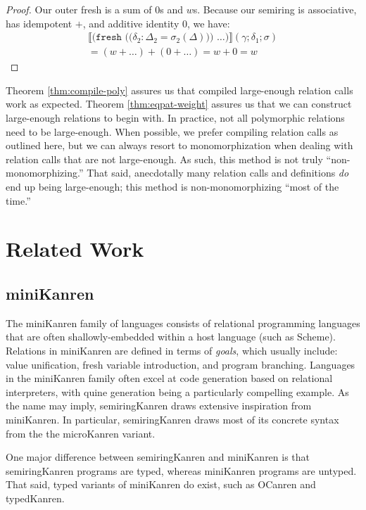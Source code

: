 \documentclass{report}
\theoremstyle{definition}
\newcommand{\den}[1]{\llbracket #1 \rrbracket}
\begin{document}
\begin{proof}
	Our outer fresh is a sum of \(0\)s and \(w\)s. Because our semiring is associative, has idempotent \(+\), and additive identity \(0\), we have:
	\begin{multline}
		\den{\texttt{(fresh ((\(\delta_2 : \Delta_2 = \sigma_2(\Delta)\))) \(\dots\))}}(\gamma;\delta_1;\sigma) \\
		= (w + \dots) + (0 + \dots) = w + 0 = w
	\end{multline}
\end{proof}

Theorem \ref{thm:compile-poly} assures us that compiled large-enough relation calls work as expected.
Theorem \ref{thm:eqpat-weight} assures us that we can construct large-enough relations to begin with.
In practice, not all polymorphic relations need to be large-enough.
When possible, we prefer compiling relation calls as outlined here, but we can always resort to monomorphization when dealing with relation calls that are not large-enough.
As such, this method is not truly ``non-monomorphizing.''
That said, anecdotally many relation calls and definitions \emph{do} end up being large-enough; this method is non-monomorphizing ``most of the time.''

\chapter{Related Work}

\section{miniKanren}

The miniKanren\cite{byrd2012} family of languages consists of relational programming languages that are often shallowly-embedded within a host language (such as Scheme).
Relations in miniKanren are defined in terms of \emph{goals}, which usually include: value unification, fresh variable introduction, and program branching.
Languages in the miniKanren family often excel at code generation based on relational interpreters, with quine generation being a particularly compelling example.
As the name may imply, semiringKanren draws extensive inspiration from miniKanren.
In particular, semiringKanren draws most of its concrete syntax from the the microKanren\cite{hemann2023} variant.

One major difference between semiringKanren and miniKanren is that semiringKanren programs are typed, whereas miniKanren programs are untyped.
That said, typed variants of miniKanren do exist, such as OCanren\cite{kosarev2018} and typedKanren\cite{kudasov2024}.
\end{document}

